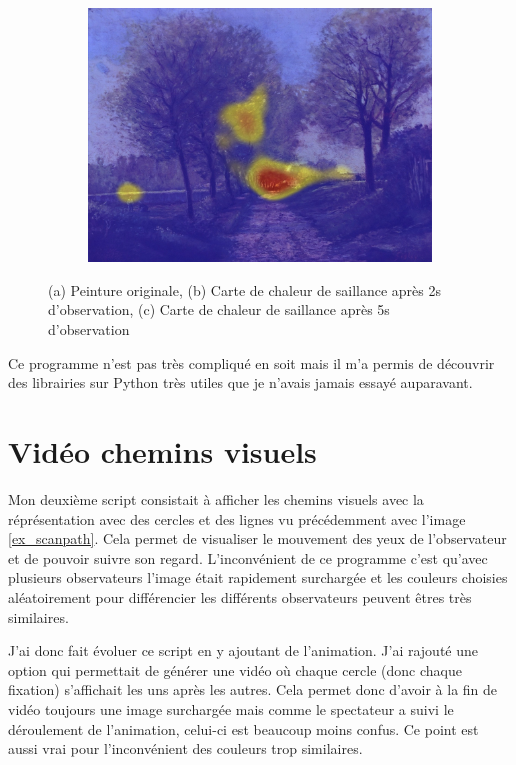 \begin{figure}[!ht]
\begin{subfigure}{.3\textwidth}
        \includegraphics[width=\linewidth]{datas/fondu_05.jpg}
        \caption{}
    \end{subfigure}
    \caption{(a) Peinture originale, (b) Carte de chaleur de saillance après 2s d'observation, (c) Carte de chaleur de saillance après 5s d'observation}
    \label{fondu}
\end{figure}

\par
Ce programme n'est pas très compliqué en soit mais il m'a permis de découvrir des librairies sur Python très utiles que je n'avais jamais essayé auparavant.

\section{Vidéo chemins visuels}

Mon deuxième script consistait à afficher les chemins visuels avec la réprésentation avec des cercles et des lignes vu précédemment avec l'image \ref{ex_scanpath}. Cela permet de visualiser le mouvement des yeux de l'observateur et de pouvoir suivre son regard. L'inconvénient de ce programme c'est qu'avec plusieurs observateurs l'image était rapidement surchargée et les couleurs choisies aléatoirement pour différencier les différents observateurs peuvent êtres très similaires.

\par
J'ai donc fait évoluer ce script en y ajoutant de l'animation. J'ai rajouté une option qui permettait de générer une vidéo où chaque cercle (donc chaque fixation) s'affichait les uns après les autres. Cela permet donc d'avoir à la fin de vidéo toujours une image surchargée mais comme le spectateur a suivi le déroulement de l'animation, celui-ci est beaucoup moins confus. Ce point est aussi vrai pour l'inconvénient des couleurs trop similaires.